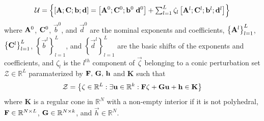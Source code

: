 \begin{equation}
\mathcal{U} = \left\{\left[\mathbf{A};\mathbf{C};\mathbf{b};\mathbf{d}\right] = \left[\mathbf{A}^0;\mathbf{C}^0;\mathbf{b}^0\;\mathbf{d}^0 \right] + \textstyle{\sum_{l=1}^{L}\zeta_l\left[\mathbf{A}^l;\mathbf{C}^l;\mathbf{b}^l; \mathbf{d}^l\right]}\right\}
\label{Data}
\end{equation}
where $\mathbf{A}^0$, $\mathbf{C}^0$, $\vec{b}^0$, and $\vec{d}^0$ are the nominal exponents and coefficients, $\left\{\mathbf{A}^l\right\}_{l=1}^{L}$, $\left\{\mathbf{C}^l\right\}_{l=1}^{L}$, $\left\{\vec{b}^l\right\}_{l=1}^{L}$, and $\left\{\vec{d}^l\right\}_{l=1}^{L}$ are the basic shifts of the exponents and coefficients, and $\zeta_l$ is the $l^{th}$ component of $\vec{\zeta}$ belonging to a conic perturbation set $\mathcal{Z} \in \mathbb{R}^L$ paramaterized by $\mathbf{F},\,\mathbf{G},\,\mathbf{h}$ and $\textbf{K}$ such that
\begin{equation}
\mathcal{Z} = \left\{ \mathbf{\zeta} \in \mathbb{R}^L: \exists \mathbf{u} \in \mathbb{R}^k:\mathbf{F}\mathbf{\zeta} + \mathbf{G}\mathbf{u} + \mathbf{h} \in \textbf{K} \right\}
\label{perturbation_set}
\end{equation}
where $\mathbf{K}$ is a regular cone in $\mathbb{R}^N$ with a non-empty interior
if it is not polyhedral, $\mathbf{F} \in \mathbb{R}^{N \times L}$, $\mathbf{G} \in \mathbb{R}^{N \times k}$,
and $\vec{h} \in \mathbb{R}^{N}$.

